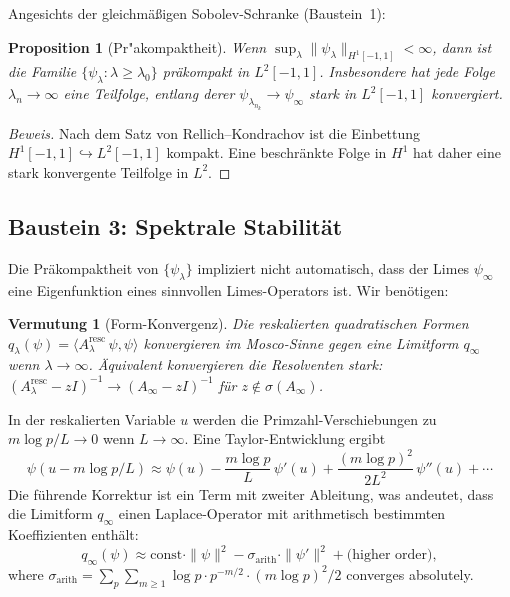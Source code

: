﻿\documentclass[12pt,a4paper]{article}
\newtheorem{proposition}[theorem]{Proposition}
\newtheorem{conjecture}[theorem]{Vermutung}
\theoremstyle{definition}
\theoremstyle{remark}
\begin{document}
Angesichts der gleichmäßigen Sobolev-Schranke (Baustein~1):

\begin{proposition}[Pr"akompaktheit]
\label{prop:precompact}
Wenn $\sup_\lambda \|\psi_\lambda\|_{H^1[-1,1]} < \infty$, dann ist die Familie $\{\psi_\lambda : \lambda \geq \lambda_0\}$ präkompakt in $L^2[-1,1]$. Insbesondere hat jede Folge $\lambda_n \to \infty$ eine Teilfolge, entlang derer $\psi_{\lambda_{n_k}} \to \psi_\infty$ stark in $L^2[-1,1]$ konvergiert.
\end{proposition}

\begin{proof}[Beweis]
Nach dem Satz von Rellich--Kondrachov ist die Einbettung $H^1[-1,1] \hookrightarrow L^2[-1,1]$ kompakt. Eine beschränkte Folge in $H^1$ hat daher eine stark konvergente Teilfolge in $L^2$.
\end{proof}

\subsection{Baustein 3: Spektrale Stabilit\"at}

Die Präkompaktheit von $\{\psi_\lambda\}$ impliziert nicht automatisch, dass der Limes $\psi_\infty$ eine Eigenfunktion eines sinnvollen Limes-Operators ist. Wir benötigen:

\begin{conjecture}[Form-Konvergenz]
\label{conj:mosco}
Die reskalierten quadratischen Formen $q_\lambda(\psi) = \langle A_\lambda^{\mathrm{resc}}\,\psi, \psi\rangle$ konvergieren im Mosco-Sinne gegen eine Limitform $q_\infty$ wenn $\lambda \to \infty$. Äquivalent konvergieren die Resolventen stark:
$(A_\lambda^{\mathrm{resc}} - zI)^{-1} \to (A_\infty - zI)^{-1}$ für $z \notin \sigma(A_\infty)$.
\end{conjecture}

In der reskalierten Variable $u$ werden die Primzahl-Verschiebungen zu $m\log p / L \to 0$ wenn $L \to \infty$. Eine Taylor-Entwicklung ergibt
\[
  \psi(u - m\log p / L) \approx \psi(u) - \frac{m\log p}{L}\,\psi'(u) + \frac{(m\log p)^2}{2L^2}\,\psi''(u) + \cdots
\]
Die führende Korrektur ist ein Term mit zweiter Ableitung, was andeutet, dass die Limitform $q_\infty$ einen Laplace-Operator mit arithmetisch bestimmten Koeffizienten enthält:
\begin{equation}
\label{eq:limit-form}
q_\infty(\psi) \approx \mathrm{const} \cdot \|\psi\|^2 - \sigma_{\mathrm{arith}} \cdot \|\psi'\|^2 + \text{(higher order)},
\end{equation}
where $\sigma_{\mathrm{arith}} = \sum_p \sum_{m \geq 1} \log p \cdot p^{-m/2} \cdot (m\log p)^2 / 2$ converges absolutely.
\end{document}
